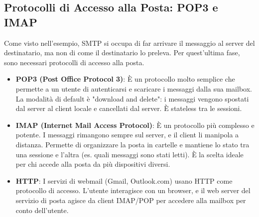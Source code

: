 
\subsection{Protocolli di Accesso alla Posta: POP3 e IMAP}
Come visto nell'esempio, SMTP si occupa di far arrivare il messaggio al server del destinatario, ma non di come il destinatario lo preleva. Per quest'ultima fase, sono necessari protocolli di accesso alla posta.
\begin{itemize}
    \item \textbf{POP3 (Post Office Protocol 3)}: È un protocollo molto semplice che permette a un utente di autenticarsi e scaricare i messaggi dalla sua mailbox. La modalità di default è "download and delete": i messaggi vengono spostati dal server al client locale e cancellati dal server. È stateless tra le sessioni.
    \item \textbf{IMAP (Internet Mail Access Protocol)}: È un protocollo più complesso e potente. I messaggi rimangono sempre sul server, e il client li manipola a distanza. Permette di organizzare la posta in cartelle e mantiene lo stato tra una sessione e l'altra (es. quali messaggi sono stati letti). È la scelta ideale per chi accede alla posta da più dispositivi diversi.
    \item \textbf{HTTP}: I servizi di webmail (Gmail, Outlook.com) usano HTTP come protocollo di accesso. L'utente interagisce con un browser, e il web server del servizio di posta agisce da client IMAP/POP per accedere alla mailbox per conto dell'utente.
\end{itemize}

